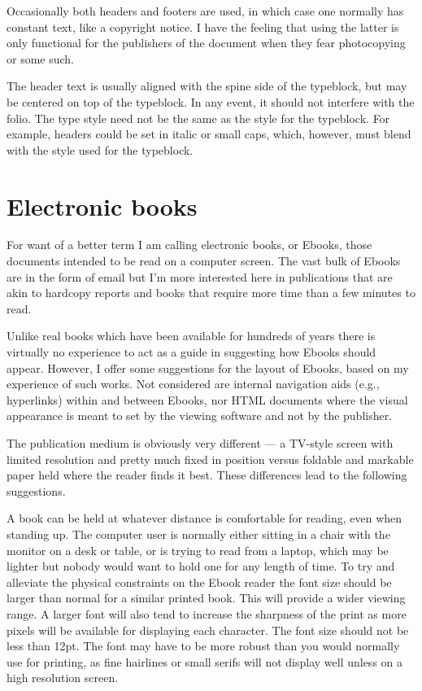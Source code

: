 \documentclass[10pt,letterpaper,extrafontsizes]{memoir}
\begin{document}
    Occasionally both headers and footers are used, in which case one normally
has constant text, like a copyright notice. 
I have the feeling that using the latter is only functional for the 
publishers of the document when they fear photocopying or some such.

    The header text is usually aligned with the spine side 
of the typeblock, but may be centered on top of the 
typeblock. In any event, it should not interfere with 
the folio. The type style need not be the same as the style 
for the typeblock. For example, headers could be set in italic
or small caps, which, however, must blend with the style used for the 
typeblock.


\section{Electronic books}

    For want of a better term I am calling electronic books, or Ebooks, 
those documents intended to be read on a computer screen. The vast bulk
of Ebooks are in the form of email but I'm more interested here in 
publications that are akin to hardcopy reports and books that require
more time than a few minutes to read.

    Unlike real books which have been available for hundreds of years there
is virtually no experience to act as a guide in suggesting how Ebooks should
appear. However, I offer some suggestions for the layout of Ebooks, based on
my experience of such works. 
Not considered are internal navigation aids
(e.g., hyperlinks) within and between Ebooks, nor HTML documents where
the visual appearance is meant to set by the viewing software and not 
by the publisher.

    The publication medium is obviously very different --- a TV-style 
screen with limited resolution and pretty much fixed in position versus
foldable and markable paper held where the reader finds it best.
These differences lead to the following suggestions.

    A book can be held at whatever distance is comfortable for reading, even
when standing up.
The computer user is normally either sitting in a chair with the monitor
on a desk or table, or is trying to read from a laptop, which may be 
lighter but nobody would want to hold one for any length of time. To try
and alleviate the physical constraints on the Ebook reader the font size
should be larger than normal for a similar printed book. This will provide
a wider viewing range. A larger font will also tend to
increase the sharpness of the print as more pixels will be available for
displaying each character.
    The font size should not be less than 12pt. The font may have to be
more robust than you would normally use for printing, as fine hairlines 
or small serifs will not display well unless on a high resolution screen.
\end{document}
